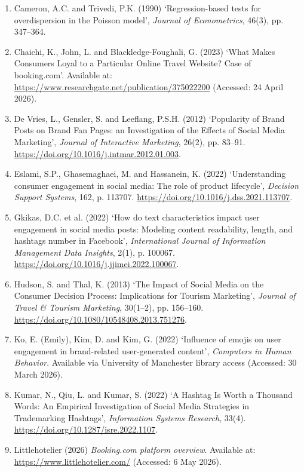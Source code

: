 \documentclass[12pt,a4paper]{ctexart}
\begin{document}
\begin{enumerate}[leftmargin=1.5em]
    \item Cameron, A.C. and Trivedi, P.K. (1990) `Regression-based tests for overdispersion in the Poisson model', \textit{Journal of Econometrics}, 46(3), pp. 347--364.
    \item Chaichi, K., John, L. and Blackledge-Foughali, G. (2023) `What Makes Consumers Loyal to a Particular Online Travel Website? Case of booking.com'. Available at: \url{https://www.researchgate.net/publication/375022200} (Accessed: 24 April 2026).
    \item De Vries, L., Gensler, S. and Leeflang, P.S.H. (2012) `Popularity of Brand Posts on Brand Fan Pages: an Investigation of the Effects of Social Media Marketing', \textit{Journal of Interactive Marketing}, 26(2), pp. 83--91. \url{https://doi.org/10.1016/j.intmar.2012.01.003}.
    \item Eslami, S.P., Ghasemaghaei, M. and Hassanein, K. (2022) `Understanding consumer engagement in social media: The role of product lifecycle', \textit{Decision Support Systems}, 162, p. 113707. \url{https://doi.org/10.1016/j.dss.2021.113707}.
    \item Gkikas, D.C. et al. (2022) `How do text characteristics impact user engagement in social media posts: Modeling content readability, length, and hashtags number in Facebook', \textit{International Journal of Information Management Data Insights}, 2(1), p. 100067. \url{https://doi.org/10.1016/j.jjimei.2022.100067}.
    \item Hudson, S. and Thal, K. (2013) `The Impact of Social Media on the Consumer Decision Process: Implications for Tourism Marketing', \textit{Journal of Travel \& Tourism Marketing}, 30(1--2), pp. 156--160. \url{https://doi.org/10.1080/10548408.2013.751276}.
    \item Ko, E. (Emily), Kim, D. and Kim, G. (2022) `Influence of emojis on user engagement in brand-related user-generated content', \textit{Computers in Human Behavior}. Available via University of Manchester library access (Accessed: 30 March 2026).
    \item Kumar, N., Qiu, L. and Kumar, S. (2022) `A Hashtag Is Worth a Thousand Words: An Empirical Investigation of Social Media Strategies in Trademarking Hashtags', \textit{Information Systems Research}, 33(4). \url{https://doi.org/10.1287/isre.2022.1107}.
    \item Littlehotelier (2026) \textit{Booking.com platform overview}. Available at: \url{https://www.littlehotelier.com/} (Accessed: 6 May 2026).

\end{enumerate}
\end{document}
